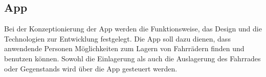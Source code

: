 \subsection{App}
Bei der Konzeptionierung der App werden die Funktionsweise, das Design und die Technologien zur Entwicklung festgelegt.
\noindent Die App soll dazu dienen, dass anwendende Personen Möglichkeiten zum Lagern von Fahrrädern finden und benutzen können. Sowohl die Einlagerung als auch die Auslagerung des Fahrrades oder Gegenstands wird über die App gesteuert werden.



\clearpage

